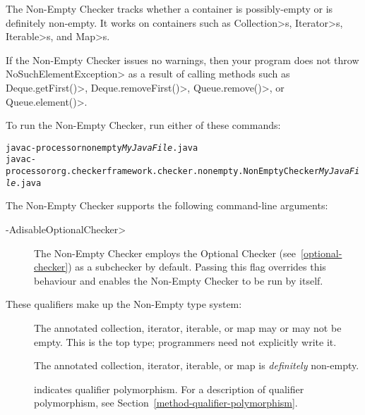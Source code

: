 \htmlhr
{}

The Non-Empty Checker tracks whether a container is possibly-empty or is
definitely non-empty.  It works on containers such as
\<Collection>s, \<Iterator>s, \<Iterable>s, and \<Map>s.

If the Non-Empty Checker issues no warnings, then your program does not
throw \<NoSuchElementException> as a result of calling methods such as
\<Deque.getFirst()>, \<Deque.removeFirst()>, \<Queue.remove()>, or
\<Queue.element()>.

To run the Non-Empty Checker, run either of these commands:

\begin{alltt}
  javac -processor nonempty \emph{MyJavaFile}.java
  javac -processor org.checkerframework.checker.nonempty.NonEmptyChecker \emph{MyJavaFile}.java
\end{alltt}

The Non-Empty Checker supports the following command-line arguments:

\begin{description}
\item[\<-AdisableOptionalChecker>]
  The Non-Empty Checker employs the Optional Checker
  (see~\ref{optional-checker}) as a subchecker by default.
  Passing this flag overrides this behaviour and enables the Non-Empty Checker
  to be run by itself.
\end{description}


These qualifiers make up the Non-Empty type system:

\begin{description}

\item[]
  The annotated collection, iterator, iterable, or map may or may not be empty.
  This is the top type; programmers need not explicitly write it.

\item[]
  The annotated collection, iterator, iterable, or map is \emph{definitely}
  non-empty.

\item[]
  indicates qualifier polymorphism.
  For a description of qualifier polymorphism, see
  Section~\ref{method-qualifier-polymorphism}.

\end{description}

